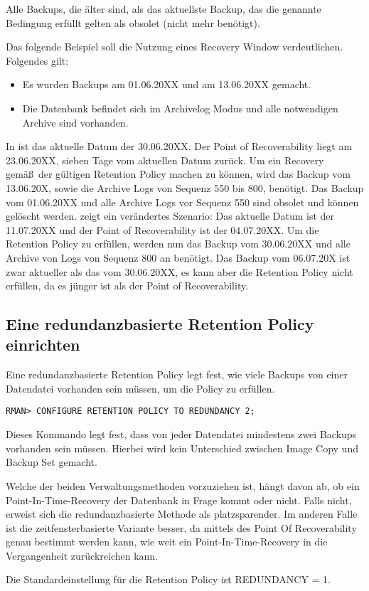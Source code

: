         Alle Backups, die älter sind, als das aktuellste Backup, das die genannte Bedingung erfüllt gelten als obsolet (nicht mehr benötigt).

        Das folgende Beispiel soll die Nutzung eines Recovery Window verdeutlichen. Folgendes gilt:
        \begin{itemize}
          \item Es wurden Backups am 01.06.20XX und am 13.06.20XX gemacht.
          \item Die Datenbank befindet sich im Archivelog Modus und alle notwendigen Archive sind vorhanden.
        \end{itemize}
        In  ist das aktuelle Datum der 30.06.20XX. Der Point of Recoverability liegt am 23.06.20XX, sieben Tage vom aktuellen Datum zurück. Um ein Recovery gemäß\ der gültigen Retention Policy machen zu können, wird das Backup vom 13.06.20X, sowie die Archive Logs von Sequenz 550 bis 800, benötigt. Das Backup vom 01.06.20XX und alle Archive Logs vor Sequenz 550 sind obsolet und können gelöscht werden.
         zeigt ein verändertes Szenario:
        Das aktuelle Datum ist der 11.07.20XX und der Point of Recoverability ist der 04.07.20XX. Um die Retention Policy zu erfüllen, werden nun das Backup vom 30.06.20XX und alle Archive von Logs von Sequenz 800 an benötigt. Das Backup vom 06.07.20X ist zwar aktueller als das vom 30.06.20XX, es kann aber die Retention Policy nicht erfüllen, da es jünger ist als der Point of Recoverability.
      \subsection{Eine redundanzbasierte Retention Policy einrichten}
        Eine redundanzbasierte Retention Policy legt fest, wie viele Backups von einer Datendatei vorhanden sein müssen, um die Policy zu erfüllen.
        \begin{lstlisting}[caption={REDUNDANCY setzen},label=admin1026,language=rman]
RMAN> CONFIGURE RETENTION POLICY TO REDUNDANCY 2;
        \end{lstlisting}
        Dieses Kommando legt fest, dass von jeder Datendatei mindestens zwei Backups vorhanden sein müssen. Hierbei wird kein Unterschied zwischen Image Copy und Backup Set gemacht.

        Welche der beiden Verwaltungsmethoden vorzuziehen ist, hängt davon ab, ob ein Point-In-Time-Recovery der Datenbank in Frage kommt oder nicht. Falls nicht, erweist sich die redundanzbasierte Methode als platzsparender. Im anderen Falle ist die zeitfensterbasierte Variante besser, da mittels des Point Of Recoverability genau bestimmt werden kann, wie weit ein Point-In-Time-Recovery in die Vergangenheit zurückreichen kann.
        \begin{merke}
          Die Standardeinstellung für die Retention Policy ist REDUNDANCY = 1.
        \end{merke}
